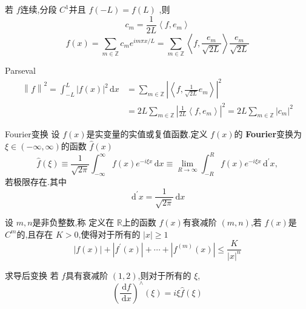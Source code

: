 \documentclass[../../PDE.tex]{subfiles}
\begin{document}
\begin{proposition}
    若 \(  f  \)连续,分段 \(  C^{1}  \)并且 \(  f\left( -L \right)= f\left( L \right)    \)   ,则 \[
    c_{m}= \frac{1 }{2L } \left<f, e_{m} \right> 
    \] \[
    f\left( x \right)= \sum _{m\in \mathbb{Z} }c_{m} e^{im \pi x /L}=  \sum _{m \in \mathbb{Z} }  \left<f,\frac{e_{m} }{\sqrt{2L} }  \right> \frac{e_{m} }{\sqrt{2L} } 
    \]
\end{proposition}

\begin{theorem}{Parseval}
     \[
     \begin{aligned}
     \left\| f \right\|^{2}= \int_{-L}^{L}\left| f\left( x \right)  \right|^{2}\,\mathrm{d} x&=  \sum _{m \in \mathbb{Z} }   \left| \left<f, \frac{1 }{\sqrt{2L} }e_{m}  \right> \right|^{2}\\ 
      &=  2L \sum _{m \in \mathbb{Z} } \left| \frac{1 }{2L } \left<f, e_{m} \right>  \right|^{2}=  2L\sum _{m \in \mathbb{Z} }\left| c_{m} \right|^{2}  
     \end{aligned}
     \]
\end{theorem}


\begin{definition}{Fourier变换}
    设 \(  f\left( x \right)   \)是实变量的实值或复值函数.定义 \(  f\left( x \right)   \)的 \textbf{Fourier}变换为 \(   \xi \in \left( -\infty,\infty \right)   \)的函数 \(  \hat{f}\left( x \right)   \) \[
    \hat{f}\left(  \xi  \right)\equiv  \frac{1 }{\sqrt{2\pi } }\int_{-\infty}^{\infty}f\left( x \right)e^{-i \xi x}\,\mathrm{d} x  \equiv  \lim_{R\to \infty} \int_{-R}^{R}f\left( x \right)e^{-i  \xi x}\,\mathrm{d} ^{\prime} x,  
    \]若极限存在.其中 \[
    \,\mathrm{d} ^{\prime} x= \frac{1 }{\sqrt{2\pi } } \,\mathrm{d} x 
    \]   
\end{definition}

\begin{definition}
    设 \(  m,n  \)是非负整数,称 定义在 \(  \mathbb{R}   \)上的函数 \(  f\left( x \right)   \)有衰减阶 \(  \left( m,n \right)   \),若 \(  f\left( x \right)   \)是 \(  C^{m}  \)的,且存在 \(  K> 0  \),使得对于所有的 \(  \left| x \right|\ge 1   \) \[
    \left| f\left( x \right)  \right|+ \left| f^{\prime} \left( x \right)  \right|+ \cdots + \left| f^{\left( m \right) }\left( x \right)  \right|\le \frac{K }{\left| x \right|^{n}  }    
    \]        
\end{definition}
\begin{proposition}{求导后变换}
    若 \(  f  \)具有衰减阶 \(  \left( 1,2 \right)   \),则对于所有的 \(   \xi   \), \[
    \left( \frac{\,\mathrm{d} f }{\,\mathrm{d} x }  \right)^{\wedge } \left(  \xi  \right)= i  \xi  \hat{f}\left(  \xi  \right)   
    \]   
\end{proposition}
\end{document}
